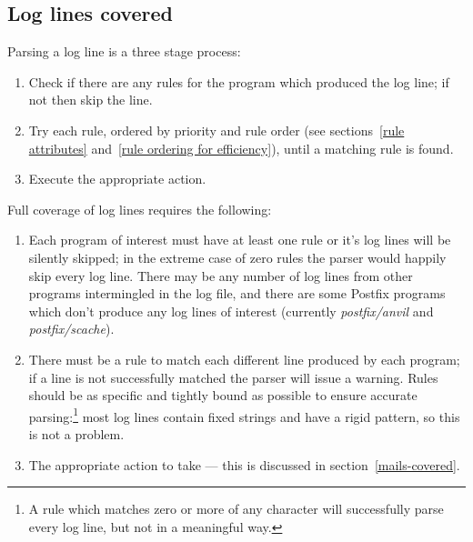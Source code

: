 \documentclass[a4paper,12pt,draft]{article}
\begin{document}
\label{parsing-coverage}

\subsection{Log lines covered}

\label{log-lines-covered}

Parsing a log line is a three stage process:

\begin{enumerate}

    \item Check if there are any rules for the program which produced the
        log line; if not then skip the line.  

    \item Try each rule, ordered by priority and rule order (see
        sections~\ref{rule attributes} and~\ref{rule ordering for
        efficiency}), until a matching rule is found.

    \item Execute the appropriate action.

\end{enumerate}

Full coverage of log lines requires the following:

\begin{enumerate}

    \item Each program of interest must have at least one rule or it's log
        lines will be silently skipped; in the extreme case of zero rules
        the parser would happily skip every log line.  There may be any
        number of log lines from other programs intermingled in the log
        file, and there are some Postfix programs which don't produce any
        log lines of interest (currently \textit{postfix/anvil\/} and
        \textit{postfix/scache\/}).

    \item There must be a rule to match each different line produced by
        each program; if a line is not successfully matched the parser will
        issue a warning.  Rules should be as specific and tightly bound as
        possible to ensure accurate parsing:\footnote{A rule which matches
        zero or more of any character will successfully parse every log
        line, but not in a meaningful way.} most log lines contain fixed
        strings and have a rigid pattern, so this is not a problem.

    \item The appropriate action to take --- this is discussed in
        section~\ref{mails-covered}.

\end{enumerate}
\end{document}
